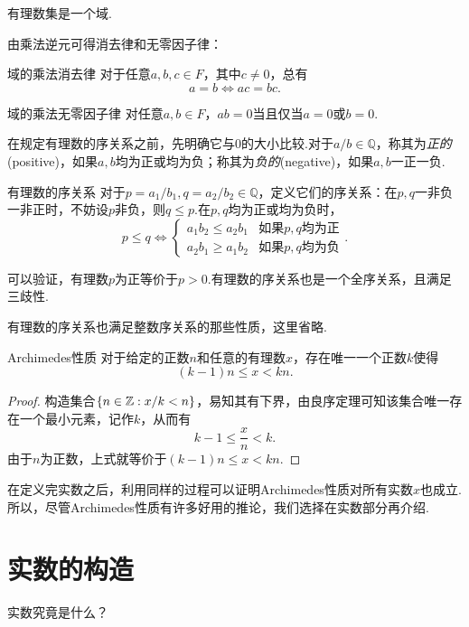 有理数集是一个域.

由乘法逆元可得消去律和无零因子律：

\begin{proposition}{域的乘法消去律}
	对于任意$a,b,c \in F$，其中$c \neq 0$，总有$$a=b \Leftrightarrow ac=bc.$$
\end{proposition}

\begin{corollary}{域的乘法无零因子律}
	对任意$a,b \in F$，$ab=0$当且仅当$a=0$或$b=0$.
\end{corollary}

在规定有理数的序关系之前，先明确它与$0$的大小比较.对于$a/b \in \mathbb{Q}$，称其为\textit{正的}(positive)，如果$a,b$均为正或均为负；称其为\textit{负的}(negative)，如果$a,b$一正一负.

\begin{definition}{有理数的序关系}
	对于$p=a_1/b_1,q=a_2/b_2 \in \mathbb{Q}$，定义它们的序关系：在$p,q$一非负一非正时，不妨设$p$非负，则$q \leq p$.在$p,q$均为正或均为负时，
	$$p \leq q \Leftrightarrow \begin{cases}
		a_1b_2 \leq a_2b_1 & \textit{如果$p,q$均为正} \\
		a_2b_1 \geq a_1b_2 & \textit{如果$p,q$均为负}
	\end{cases}.$$
\end{definition}

可以验证，有理数$p$为正等价于$p>0$.有理数的序关系也是一个全序关系，且满足三歧性.

有理数的序关系也满足整数序关系的那些性质，这里省略.

\begin{theorem}{Archimedes性质}
	对于给定的正数$n$和任意的有理数$x$，存在唯一一个正数$k$使得$$(k-1)n \leq x < kn.$$
\end{theorem}
\begin{proof}
	构造集合$\{ n \in \mathbb{Z} : x/k <n \}$，易知其有下界，由良序定理可知该集合唯一存在一个最小元素，记作$k$，从而有$$k-1 \leq \frac{x}{n} < k.$$
	由于$n$为正数，上式就等价于$(k-1)n \leq x < kn$. 
\end{proof}

在定义完实数之后，利用同样的过程可以证明Archimedes性质对所有实数$x$也成立.所以，尽管Archimedes性质有许多好用的推论，我们选择在实数部分再介绍.

\section{实数的构造}

实数究竟是什么？

